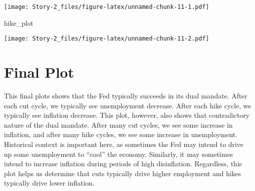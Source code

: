 \documentclass[
]{article}
\newenvironment{Shaded}{\begin{snugshade}}{\end{snugshade}}
\newcommand{\NormalTok}[1]{#1}
\begin{document}
\texttt{[image: Story-2\_files/figure-latex/unnamed-chunk-11-1.pdf]}

\begin{Shaded}
\begin{Highlighting}[]
\NormalTok{hike\_plot}
\end{Highlighting}
\end{Shaded}

\texttt{[image: Story-2\_files/figure-latex/unnamed-chunk-11-2.pdf]}

\section{Final Plot}\label{final-plot}

This final plots shows that the Fed typically succeeds in its dual
mandate. After each cut cycle, we typically see unemployment decrease.
After each hike cycle, we typically see inflation decrease. This plot,
however, also shows that contradictory nature of the dual mandate. After
many cut cycles, we see some increase in inflation, and after many hike
cycles, we see some increase in unemployment. Historical context is
important here, as sometimes the Fed may intend to drive up some
unemployment to ``cool'' the economy. Similarly, it may sometimes intend
to increase inflation during periods of high disinflation. Regardless,
this plot helps us determine that cuts typically drive higher employment
and hikes typically drive lower inflation.
\end{document}
